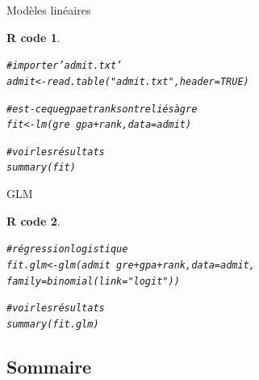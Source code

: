\documentclass[11pt]{beamer}\usepackage[]{graphicx}\usepackage[]{color}
\makeatletter
\newcommand{\hlnum}[1]{\textcolor[rgb]{0.063,0.58,0.627}{#1}}%
\newcommand{\hlstr}[1]{\textcolor[rgb]{0.063,0.58,0.627}{#1}}%
\newcommand{\hlcom}[1]{\textcolor[rgb]{0.588,0.588,0.588}{#1}}%
\newcommand{\hlopt}[1]{\textcolor[rgb]{0.196,0.196,0.196}{#1}}%
\newcommand{\hlstd}[1]{\textcolor[rgb]{0.196,0.196,0.196}{#1}}%
\newcommand{\hlkwb}[1]{\textcolor[rgb]{0.627,0,0.314}{#1}}%
\newcommand{\hlkwc}[1]{\textcolor[rgb]{0,0.631,0.314}{#1}}%
\newcommand{\hlkwd}[1]{\textcolor[rgb]{0.78,0.227,0.412}{#1}}%
\newenvironment{kframe}{%
 \def\at@end@of@kframe{}%
 \ifinner\ifhmode%
  \def\at@end@of@kframe{\end{minipage}}%
  \begin{minipage}{\columnwidth}%
 \fi\fi%
 \def\FrameCommand##1{\hskip\@totalleftmargin \hskip-\fboxsep
 \colorbox{shadecolor}{##1}\hskip-\fboxsep
     \hskip-\linewidth \hskip-\@totalleftmargin \hskip\columnwidth}%
 \MakeFramed {\advance\hsize-\width
   \@totalleftmargin\z@ \linewidth\hsize
   \@setminipage}}%
 {\par\unskip\endMakeFramed%
 \at@end@of@kframe}
\newenvironment{knitrout}{}{} %
\newtheorem{rcode}{R code}[section]
\makeatother
\begin{document}
\begin{frame}[fragile]{Modèles linéaires}

\begin{knitrout}
\color{fgcolor}\begin{kframe}
\begin{rcode}\label{unnamed-chunk-41}\begin{alltt}
\hlcom{# importer 'admit.txt'}
\hlstd{admit} \hlkwb{<-} \hlkwd{read.table}\hlstd{(}\hlstr{"admit.txt"}\hlstd{,} \hlkwc{header} \hlstd{=} \hlnum{TRUE}\hlstd{)}

\hlcom{# est-ce que gpa et rank sont reliés à gre}
\hlstd{fit} \hlkwb{<-} \hlkwd{lm}\hlstd{(gre} \hlopt{~} \hlstd{gpa}\hlopt{+}\hlstd{rank,} \hlkwc{data} \hlstd{= admit)}

\hlcom{# voir les résultats}
\hlkwd{summary}\hlstd{(fit)}
\end{alltt}
\end{rcode}\end{kframe}
\end{knitrout}

\end{frame}


\begin{frame}[fragile]{GLM}

\begin{knitrout}
\color{fgcolor}\begin{kframe}
\begin{rcode}\label{unnamed-chunk-42}\begin{alltt}
\hlcom{# régression logistique}
\hlstd{fit.glm} \hlkwb{<-} \hlkwd{glm}\hlstd{(admit} \hlopt{~} \hlstd{gre}\hlopt{+}\hlstd{gpa}\hlopt{+}\hlstd{rank,} \hlkwc{data} \hlstd{= admit,}
           \hlkwc{family} \hlstd{=} \hlkwd{binomial}\hlstd{(}\hlkwc{link} \hlstd{=} \hlstr{"logit"}\hlstd{))}

\hlcom{# voir les résultats}
\hlkwd{summary}\hlstd{(fit.glm)}
\end{alltt}
\end{rcode}\end{kframe}
\end{knitrout}

\end{frame}




\subsection{Sommaire}
\end{document}
